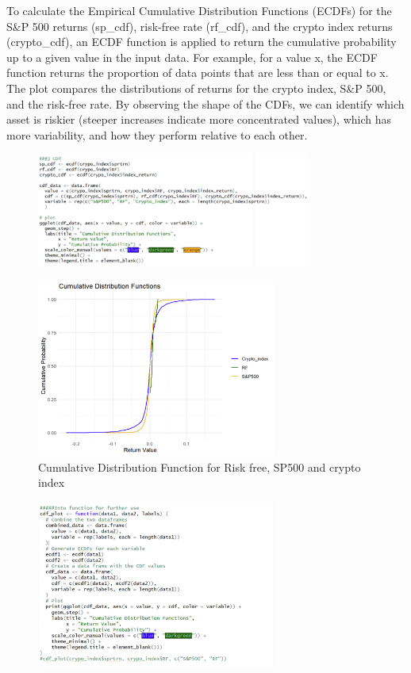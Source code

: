 \documentclass{article}
\begin{document}
To calculate the Empirical Cumulative Distribution Functions (ECDFs) for the S\&P 500 returns (sp\_cdf), risk-free rate (rf\_cdf), and the crypto index returns (crypto\_cdf), an ECDF function is applied to return the cumulative probability up to a given value in the input data. For example, for a value x, the ECDF function returns the proportion of data points that are less than or equal to x. The plot compares the distributions of returns for the crypto index, S\&P 500, and the risk-free rate. By observing the shape of the CDFs, we can identify which asset is riskier (steeper increases indicate more concentrated values), which has more variability, and how they perform relative to each other.

\begin{figure}[H]
    \centering
    \includegraphics[width=0.8\textwidth]{8.png}
    \label{fig:example}
\end{figure}
\begin{figure}[H]
    \centering
    \includegraphics[width=0.7\textwidth]{9.png}
    \caption{Cumulative Distribution Function for Risk free, SP500 and crypto index}
    \label{fig:example}
\end{figure}
\begin{figure}[H]
    \centering
    \includegraphics[width=0.7\textwidth]{10.png}
    \label{fig:example}
\end{figure}
\end{document}
